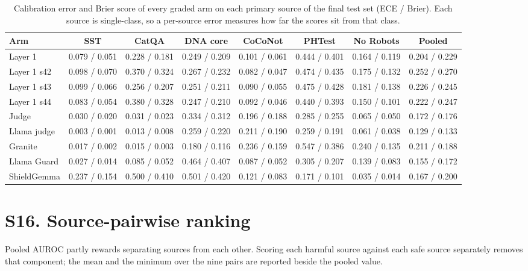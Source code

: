\begin{table}[!htbp]
\caption{Calibration error and Brier score of every graded arm on each primary source of the final test set (ECE / Brier). Each source is single-class, so a per-source error measures how far the scores sit from that class.}
\label{tab:persource}
\centering
\scriptsize
\setlength{\tabcolsep}{3pt}
\begin{tabular}{@{}lccccccc@{}}
\toprule
Arm & SST & CatQA & DNA core & CoCoNot & PHTest & No Robots & Pooled \\
\midrule
Layer 1 & 0.079 / 0.051 & 0.228 / 0.181 & 0.249 / 0.209 & 0.101 / 0.061 & 0.444 / 0.401 & 0.164 / 0.119 & 0.204 / 0.229 \\
Layer 1 s42 & 0.098 / 0.070 & 0.370 / 0.324 & 0.267 / 0.232 & 0.082 / 0.047 & 0.474 / 0.435 & 0.175 / 0.132 & 0.252 / 0.270 \\
Layer 1 s43 & 0.099 / 0.066 & 0.256 / 0.207 & 0.251 / 0.211 & 0.090 / 0.055 & 0.475 / 0.428 & 0.181 / 0.138 & 0.226 / 0.245 \\
Layer 1 s44 & 0.083 / 0.054 & 0.380 / 0.328 & 0.247 / 0.210 & 0.092 / 0.046 & 0.440 / 0.393 & 0.150 / 0.101 & 0.222 / 0.247 \\
Judge & 0.030 / 0.020 & 0.031 / 0.023 & 0.334 / 0.312 & 0.196 / 0.188 & 0.285 / 0.255 & 0.065 / 0.050 & 0.172 / 0.176 \\
Llama judge & 0.003 / 0.001 & 0.013 / 0.008 & 0.259 / 0.220 & 0.211 / 0.190 & 0.259 / 0.191 & 0.061 / 0.038 & 0.129 / 0.133 \\
Granite & 0.017 / 0.002 & 0.015 / 0.003 & 0.180 / 0.116 & 0.236 / 0.159 & 0.547 / 0.386 & 0.240 / 0.135 & 0.211 / 0.188 \\
Llama Guard & 0.027 / 0.014 & 0.085 / 0.052 & 0.464 / 0.407 & 0.087 / 0.052 & 0.305 / 0.207 & 0.139 / 0.083 & 0.155 / 0.172 \\
ShieldGemma & 0.237 / 0.154 & 0.500 / 0.410 & 0.501 / 0.420 & 0.121 / 0.083 & 0.171 / 0.101 & 0.035 / 0.014 & 0.167 / 0.200 \\
\bottomrule
\end{tabular}
\end{table}

\section*{S16. Source-pairwise ranking}

Pooled AUROC partly rewards separating sources from each other. Scoring each harmful source against each safe source separately removes that component; the mean and the minimum over the nine pairs are reported beside the pooled value.

